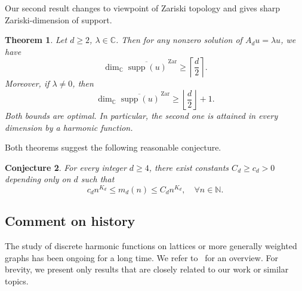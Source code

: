 \documentclass[11pt,reqno]{amsart}
\newcommand\N{\ensuremath{\mathbb{N}}}
\newcommand\C{\ensuremath{\mathbb{C}}}
\newcommand{\supp}{\operatorname{supp}}
\newtheorem{theorem}{Theorem}[section]
\newtheorem{conjecture}[theorem]{Conjecture}
\theoremstyle{definition}
\theoremstyle{plain}
\numberwithin{equation}{section}
\begin{document}
Our second result changes to viewpoint of Zariski topology and gives sharp Zariski-dimension of support. 
\begin{theorem}\label{thm-zariski}
    Let $d\ge 2$, $\lambda\in \C$. Then for any nonzero solution of $A_du=\lambda u$, we have
    \begin{equation}\label{eq:zariski-general}
        \dim_\C \overline{\supp(u)}^{\,\mathrm{Zar}}\ge \left\lceil \frac{d}{2}\right\rceil.
    \end{equation}
    Moreover, if $\lambda\neq 0$, then
    \begin{equation}\label{eq:zariski-nonzero}
        \dim_\C \overline{\supp(u)}^{\,\mathrm{Zar}}\ge \left\lfloor\frac{d}{2}\right\rfloor+1.
    \end{equation}
    Both bounds are optimal. In particular, the second one is attained in every dimension by a harmonic function.
\end{theorem}


Both theorems suggest the following reasonable conjecture.
\begin{conjecture}
For every integer $d\ge 4$, there exist constants $C_d\ge c_d>0$ depending only on $d$ such that
\begin{equation*}
    c_dn^{K_d}\le  m_d(n)\le C_d n^{K_d},\quad \forall n\in \N.
\end{equation*}
\end{conjecture}





\subsection{Comment on history}\label{subsec:history}
The study of discrete harmonic functions on lattices or more generally weighted graphs has been ongoing for a long time. We refer to~\cite{uniqueness2023malinnikova} for an overview. For brevity, we present only results that are closely related to our work or similar topics. 
\end{document}
